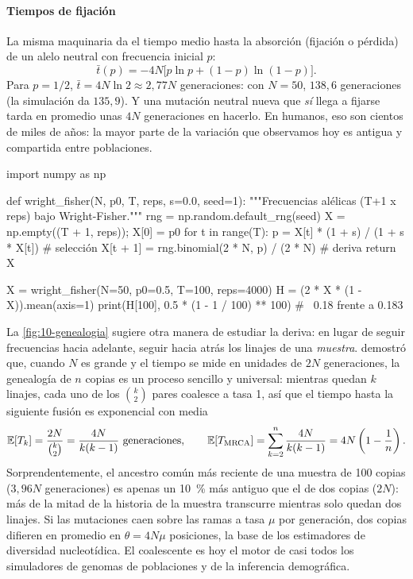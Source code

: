 \paragraph{Tiempos de fijación} La misma maquinaria da el tiempo medio hasta la absorción (fijación o pérdida) de un alelo neutral con frecuencia inicial $p$:
\begin{equation}\label{eq:10-tiempo}
\bar t(p) = -4N\big[p\ln p + (1-p)\ln(1-p)\big].
\end{equation}
Para $p=1/2$, $\bar t=4N\ln2\approx2{,}77N$ generaciones: con $N=50$, $138{,}6$ generaciones (la simulación da $135{,}9$). Y una mutación neutral nueva que \emph{sí} llega a fijarse tarda en promedio unas $4N$ generaciones en hacerlo. En humanos, eso son cientos de miles de años: la mayor parte de la variación que observamos hoy es antigua y compartida entre poblaciones.

\begin{codigo}
import numpy as np

def wright_fisher(N, p0, T, reps, s=0.0, seed=1):
    """Frecuencias alélicas (T+1 x reps) bajo Wright-Fisher."""
    rng = np.random.default_rng(seed)
    X = np.empty((T + 1, reps)); X[0] = p0
    for t in range(T):
        p = X[t] * (1 + s) / (1 + s * X[t])       # selección
        X[t + 1] = rng.binomial(2 * N, p) / (2 * N)  # deriva
    return X

X = wright_fisher(N=50, p0=0.5, T=100, reps=4000)
H = (2 * X * (1 - X)).mean(axis=1)
print(H[100], 0.5 * (1 - 1 / 100) ** 100)        # ~0.18 frente a 0.183
\end{codigo}

\begin{profundizacion}
La \cref{fig:10-genealogia} sugiere otra manera de estudiar la deriva: en lugar de seguir frecuencias hacia adelante, seguir hacia atrás los linajes de una \emph{muestra}. \textcite{c10-kingman1982} demostró que, cuando $N$ es grande y el tiempo se mide en unidades de $2N$ generaciones, la genealogía de $n$ copias es un proceso sencillo y universal: mientras quedan $k$ linajes, cada uno de los $\binom{k}{2}$ pares coalesce a tasa 1, así que el tiempo hasta la siguiente fusión es exponencial con media
\[
\mathbb{E}[T_k] = \frac{2N}{\binom{k}{2}} = \frac{4N}{k(k-1)}\ \text{generaciones},\qquad
\mathbb{E}[T_{\text{MRCA}}] = \sum_{k=2}^{n}\frac{4N}{k(k-1)} = 4N\left(1-\frac1n\right).
\]
Sorprendentemente, el ancestro común más reciente de una muestra de 100 copias ($3{,}96N$ generaciones) es apenas un \SI{10}{\percent} más antiguo que el de dos copias ($2N$): más de la mitad de la historia de la muestra transcurre mientras solo quedan dos linajes. Si las mutaciones caen sobre las ramas a tasa $\mu$ por generación, dos copias difieren en promedio en $\theta=4N\mu$ posiciones, la base de los estimadores de diversidad nucleotídica. El coalescente es hoy el motor de casi todos los simuladores de genomas de poblaciones y de la inferencia demográfica.
\end{profundizacion}


